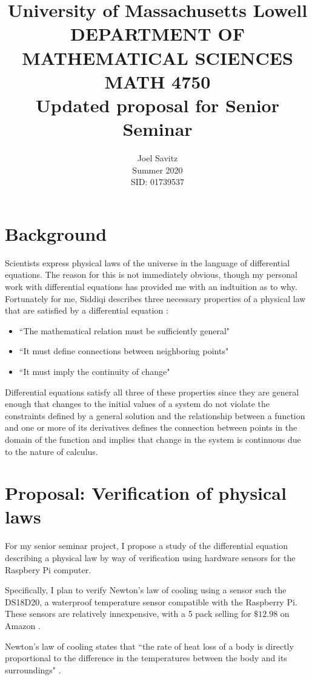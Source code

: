 \documentclass[12pt]{amsart}
\title{ University of Massachusetts Lowell \protect\\
	DEPARTMENT OF MATHEMATICAL SCIENCES \protect\\
MATH 4750 \protect\\
Updated proposal for Senior Seminar}
\author{Joel Savitz \\ Summer  2020 \\ SID: 01739537}
\begin{document}
\maketitle

\section{Background}

Scientists express physical laws of
the universe in the language of differential equations.
The reason for this is not immediately obvious,
though my personal work with differential equations
has provided me with an indtuition as to why.
Fortunately for me,
Siddiqi describes three necessary properties
of a physical law that are satisfied by a differential equation \cite{whydiffeq}:


\begin{itemize}
	\item ``The mathematical relation must be sufficiently general"
	\item ``It must define connections between neighboring points"
	\item ``It must imply the continuity of change"
\end{itemize}

Differential equations satisfy all three of these properties
since they are general enough that
changes to the initial values of a system
do not violate the constraints defined by a general solution
and the relationship between a function and one or more of its derivatives
defines the connection between points in the domain of the function
and implies that change in the system is continuous
due to the nature of calculus.

\section{Proposal: Verification of physical laws}

For my senior seminar project,
I propose a study of
the differential equation describing a physical law
by way of verification
using hardware sensors
for the Raspbery Pi computer.

Specifically, I plan to verify Newton's law of cooling
using a sensor such the DS18D20,
a waterproof temperature sensor compatible with the Raspberry Pi.
These sensors are relatively innexpensive,
with a 5 pack selling for $\$12.98$ on Amazon \cite{Amazon}.

Newton's law of cooling states that
``the rate of heat loss of a body is
directly proportional to the difference
in the temperatures between the body and
its surroundings" \cite{wiki}.
\end{document}
